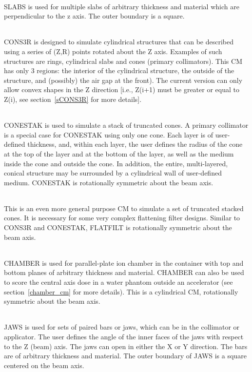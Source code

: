 \documentclass[12pt,twoside]{article}
\begin{document}
\newcommand{\subsubsubsection}[1]{\noindent {\bf #1}\\}
\subsubsubsection{SLABS}
SLABS is used for multiple slabs of arbitrary thickness and material
which are perpendicular to the z axis.  The outer boundary is a square.

\subsubsubsection{CONS3R}
CONS3R is designed to simulate cylindrical structures that can be
described using a series of (Z,R) points rotated about the Z axis.
Examples of such structures are rings, cylindrical slabs and cones
(primary collimators).  This CM has only 3 regions: the interior of
the cylindrical structure, the outside of the structure, and (possibly)
the air gap at the front).  The
current version can only allow convex shapes in the Z direction [i.e., Z(i+1)
must be greater or equal to Z(i), see section~\ref{sCONS3R}  for more details].

\subsubsubsection{CONESTAK}
CONESTAK is used to simulate a stack of truncated cones.
A primary collimator is a
special case for CONESTAK using only one cone.  Each layer is of
user-defined thickness, and, within each layer, the user defines the
radius of the cone at the top of the layer and at the bottom of the layer, as
well as the medium inside the cone and outside the cone.  In addition, the
entire, multi-layered, conical structure may be surrounded by a cylindrical
wall of user-defined medium. CONESTAK is
rotationally symmetric about the beam axis.

\subsubsubsection{FLATFILT}
This is an even more general purpose CM to simulate a set of truncated
stacked cones.  It is necessary for some very complex  flattening filter
designs.  Similar to CONS3R and CONESTAK, FLATFILT is rotationally
symmetric about the beam axis.

\subsubsubsection{CHAMBER}
CHAMBER is used for parallel-plate ion chamber in the
container with top and bottom planes of arbitrary thickness and material.
CHAMBER can also be used to score the central axis dose in a water
phantom outside an accelerator (see section~\ref{chamber_cm}
for more details).  This
is a cylindrical CM, rotationally symmetric about the beam axis.


\subsubsubsection{JAWS}
JAWS is used for sets of paired bars or jaws,
which can be in the
collimator or applicator. The user defines the angle of the inner faces of
the jaws with respect to the Z (beam) axis.  The jaws can open in either
the X or Y direction.  The bars are of arbitrary
thickness and material.
The outer boundary of JAWS is a square centered on
the beam axis.
\end{document}

